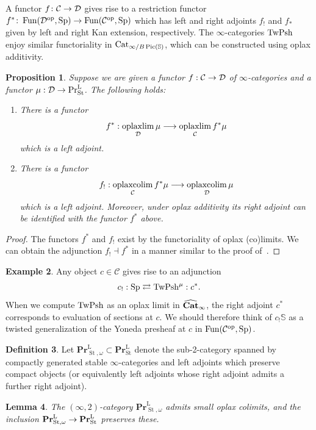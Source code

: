 \documentclass[10pt]{amsart}
\numberwithin{equation}{section}
\newtheorem{prop}{Proposition}[subsection]
\newtheorem{lem}[prop]{Lemma}
\theoremstyle{definition}
\newtheorem{definition}[prop]{Definition}
\newtheorem{ex}[prop]{Example}
\DeclareMathOperator{\Fun}{Fun}
\DeclareMathOperator{\Pic}{Pic}
\DeclareMathOperator{\op}{op}
\DeclareMathOperator{\St}{St}
\DeclareMathOperator*{\oplaxcolim}{oplaxcolim}
\DeclareMathOperator*{\oplaxlim}{oplaxlim}
\renewcommand{\Pr}{\mathrm{Pr}}
\newcommand{\bfPr}{\mathbf{Pr}}
\newcommand{\rL}{\mathrm{L}}
\newcommand{\PrLSt}{\Pr^{\rL}_{\St}}
\newcommand{\TwShv}{\mathrm{TwPsh}\vphantom{h}}
\newcommand{\Cat}{\mathrm{Cat}\vphantom{t}}
\newcommand{\bfCat}{\mathbf{Cat}\vphantom{t}}
\newcommand{\bS}{\mathbb{S}}
\newcommand{\cC}{\mathcal{C}}
\newcommand{\calD}{\mathcal{D}}
\newcommand{\Sp}{\mathrm{Sp}\vphantom{p}}
\renewcommand{\to}{\mathchoice{\longrightarrow}{\rightarrow}{}{}}
\begin{document}
A functor $f\colon \cC \to \calD$ gives rise to a restriction functor $f^{*}\colon \Fun(\calD^{\op},\Sp) \to \Fun(\cC^{\op},\Sp)$ which has left and right adjoints $f_{!}$ and $f_{*}$ given by left and right Kan extension, respectively.
The $\infty$-categories $\TwShv$ enjoy similar functoriality in $\Cat_{\infty /B\Pic(\bS)}$, which can be constructed using oplax additivity.
\begin{prop}\label{prop:adjoint_under_lax_add}
	Suppose we are given a functor $f : \cC \to \mathcal{D}$ of $\infty$-categories and a functor $\mu : \mathcal{D} \to \PrLSt$.
	The following holds:
	\begin{enumerate}
		\item There is a functor
		\[
		f^* : \oplaxlim_{\calD} \mu \to \oplaxlim_{\cC} f^* \mu
		\]
		which is a left adjoint.
		\item There is a functor
		\[
		f_! : \oplaxcolim_{\cC} f^* \mu \to \oplaxcolim_{\calD} \mu
		\]
		which is a left adjoint. Moreover, under oplax additivity its right adjoint can be identified with the functor $f^*$ above.
	\end{enumerate}
\end{prop}
\begin{proof}
	The functors $f^{*}$ and $f_{!}$ exist by the functoriality of oplax (co)limits. We can obtain the adjunction $f_{!}\dashv f^{*}$ in a manner similar to the proof of~\cite[Proposition 1.5.6]{HM}.
\end{proof}
\begin{ex}
	Any object $c\in \cC$ gives rise to an adjunction
	\begin{align*}
		c_{!} : \Sp \rightleftarrows \TwShv^{\mu} : c^{*}.
	\end{align*}
	When we compute $\TwShv$ as an oplax limit in $\widehat{\bfCat}_{\infty}$, the right adjoint $c^{*}$ corresponds to evaluation of sections at $c$.
  We should therefore think of $c_{!}\bS$ as a twisted generalization of the Yoneda presheaf at $c$ in $\Fun(\cC^{\op},\Sp)$.
\end{ex}
\begin{definition}\label{def:PrLSt_omega}
	Let $\bfPr^{\rL}_{\St,\omega} \subset \bfPr^{\rL}_{\St}$ denote the sub-2-category spanned by compactly generated stable $\infty$-categories and left adjoints which preserve compact objects (or equivalently left adjoints whose right adjoint admits a further right adjoint).
\end{definition}
\begin{lem}\label{lem:oplax_colim_in_PrLSt_omega}
	The $(\infty,2)$-category $\bfPr^{\rL}_{\St,\omega}$ admits small oplax colimits, and the inclusion $\bfPr^{\rL}_{\St,\omega} \to \bfPr^{\rL}_{\St}$ preserves these.
\end{lem}
\end{document}
